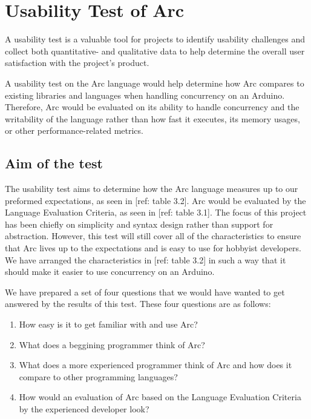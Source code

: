 \section{Usability Test of Arc}\label{subsec:usabilityTestOfArc}

A usability test is a valuable tool for projects to identify usability challenges and collect both quantitative- and qualitative data to help determine the overall user satisfaction with the project's product.

A usability test on the Arc language would help determine how Arc compares to existing libraries and languages when handling concurrency on an Arduino. Therefore, Arc would be evaluated on its ability to handle concurrency and the writability of the language rather than how fast it executes, its memory usages, or other performance-related metrics.

\subsection{Aim of the test}\label{subsubsec:aimOfTheTest}

The usability test aims to determine how the Arc language measures up to our preformed expectations, as seen in [ref: table 3.2]. Arc would be evaluated by the Language Evaluation Criteria, as seen in [ref: table 3.1]. The focus of this project has been chiefly on simplicity and syntax design rather than support for abstraction. However, this test will still cover all of the characteristics to ensure that Arc lives up to the expectations and is easy to use for hobbyist developers. We have arranged the characteristics in [ref: table 3.2] in such a way that it should make it easier to use concurrency on an Arduino.

We have prepared a set of four questions that we would have wanted to get answered by the results of this test. These four questions are as follows:

\begin{enumerate}
    \item How easy is it to get familiar with and use Arc?
    \item What does a beggining programmer think of Arc?
    \item What does a more experienced programmer think of Arc and how does it compare to other programming languages?
    \item How would an evaluation of Arc based on the Language Evaluation Criteria by the experienced developer look?
\end{enumerate}

